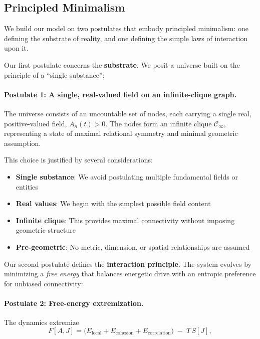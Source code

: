 \documentclass[11pt]{article}
\begin{document}
\subsection{Principled Minimalism}

We build our model on two postulates that embody principled minimalism: one defining the substrate of reality, and one defining the simple laws of interaction upon it.

Our first postulate concerns the \textbf{substrate}. We posit a universe built on the principle of a ``single substance'':

\paragraph{Postulate 1: A single, real-valued field on an infinite-clique graph.} The universe consists of an uncountable set of nodes, each carrying a single real, positive-valued field, $A_n(t) > 0$. The nodes form an infinite clique $\mathcal{C}_\infty$, representing a state of maximal relational symmetry and minimal geometric assumption.

This choice is justified by several considerations:
\begin{itemize}
\item \textbf{Single substance}: We avoid postulating multiple fundamental fields or entities
\item \textbf{Real values}: We begin with the simplest possible field content
\item \textbf{Infinite clique}: This provides maximal connectivity without imposing geometric structure
\item \textbf{Pre-geometric}: No metric, dimension, or spatial relationships are assumed
\end{itemize}

Our second postulate defines the \textbf{interaction principle}. The system evolves by minimizing a \emph{free energy} that balances energetic drive with an entropic preference for unbiased connectivity:

\paragraph{Postulate 2: Free-energy extremization.} The dynamics extremize
\begin{equation}
F[A,J] = \Big(E_{\text{local}} + E_{\text{cohesion}} + E_{\text{correlation}}\Big)\; -\; T\, S[J],
\end{equation}
\end{document}
